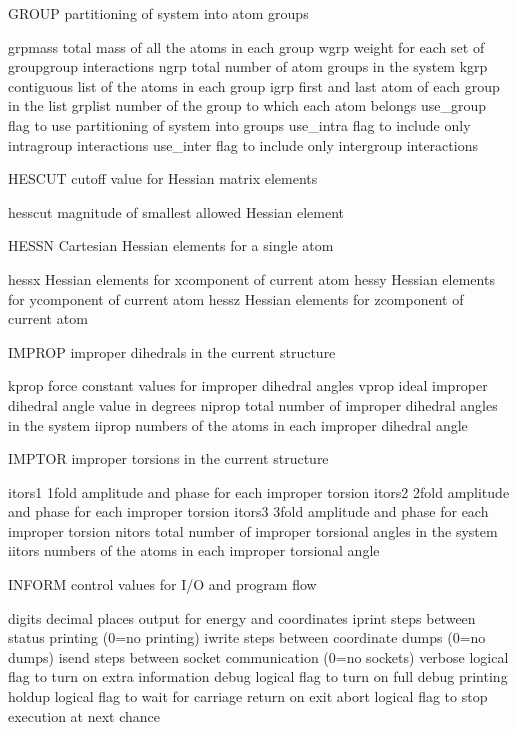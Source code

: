\documentclass[letterpaper,11pt,english]{sphinxmanual}
\begin{document}
GROUP   partitioning of system into atom groups

grpmass total mass of all the atoms in each group
wgrp    weight for each set of group\sphinxhyphen{}group interactions
ngrp    total number of atom groups in the system
kgrp    contiguous list of the atoms in each group
igrp    first and last atom of each group in the list
grplist number of the group to which each atom belongs
use\_group       flag to use partitioning of system into groups
use\_intra       flag to include only intragroup interactions
use\_inter       flag to include only intergroup interactions

HESCUT  cutoff value for Hessian matrix elements

hesscut magnitude of smallest allowed Hessian element

HESSN   Cartesian Hessian elements for a single atom

hessx   Hessian elements for x\sphinxhyphen{}component of current atom
hessy   Hessian elements for y\sphinxhyphen{}component of current atom
hessz   Hessian elements for z\sphinxhyphen{}component of current atom

IMPROP  improper dihedrals in the current structure

kprop   force constant values for improper dihedral angles
vprop   ideal improper dihedral angle value in degrees
niprop  total number of improper dihedral angles in the system
iiprop  numbers of the atoms in each improper dihedral angle

IMPTOR  improper torsions in the current structure

itors1  1\sphinxhyphen{}fold amplitude and phase for each improper torsion
itors2  2\sphinxhyphen{}fold amplitude and phase for each improper torsion
itors3  3\sphinxhyphen{}fold amplitude and phase for each improper torsion
nitors  total number of improper torsional angles in the system
iitors  numbers of the atoms in each improper torsional angle

INFORM  control values for I/O and program flow

digits  decimal places output for energy and coordinates
iprint  steps between status printing (0=no printing)
iwrite  steps between coordinate dumps (0=no dumps)
isend   steps between socket communication (0=no sockets)
verbose logical flag to turn on extra information
debug   logical flag to turn on full debug printing
holdup  logical flag to wait for carriage return on exit
abort   logical flag to stop execution at next chance
\end{document}
